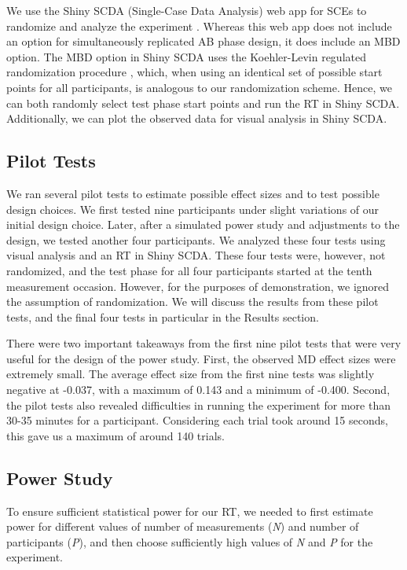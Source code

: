\documentclass{article}
\begin{document}
We use the Shiny SCDA (Single-Case Data Analysis) web app for SCEs to randomize and analyze the experiment \parencite{De2020}. Whereas this web app does not include an option for simultaneously replicated AB phase design, it does include an MBD option. The MBD option in Shiny SCDA uses the Koehler-Levin regulated randomization procedure \parencite{Levin2018}, which, when using an identical set of possible start points for all participants, is analogous to our randomization scheme. Hence, we can both randomly select test phase start points and run the RT in Shiny SCDA. Additionally, we can plot the observed data for visual analysis in Shiny SCDA. 

\subsection{Pilot Tests}

We ran several pilot tests to estimate possible effect sizes and to test possible design choices. We first tested nine participants under slight variations of our initial design choice. Later, after a simulated power study and adjustments to the design, we tested another four participants. We analyzed these four tests using visual analysis and an RT in Shiny SCDA. These four tests were, however, not randomized, and the test phase for all four participants started at the tenth measurement occasion. However, for the purposes of demonstration, we ignored the assumption of randomization. We will discuss the results from these pilot tests, and the final four tests in particular in the Results section. 

There were two important takeaways from the first nine pilot tests that were very useful for the design of the power study. First, the observed MD effect sizes were extremely small. The average effect size from the first nine tests was slightly negative at -0.037, with a maximum of 0.143 and a minimum of -0.400. Second, the pilot tests also revealed difficulties in running the experiment for more than 30-35 minutes for a participant. Considering each trial took around 15 seconds, this gave us a maximum of around 140 trials.

\subsection{Power Study}

To ensure sufficient statistical power for our RT, we needed to first estimate power for different values of number of measurements (\emph{N}) and number of participants (\emph{P}), and then choose sufficiently high values of \emph{N} and \emph{P} for the experiment. 
\end{document}
